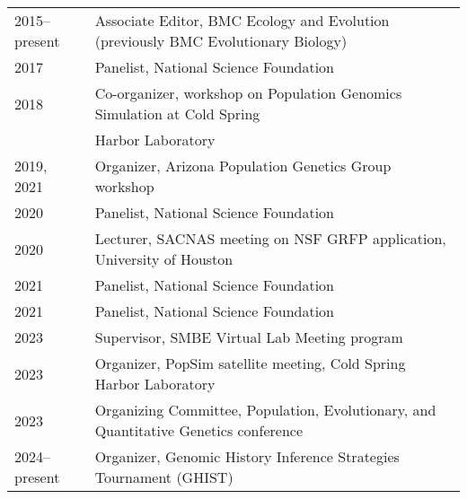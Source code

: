 \documentclass[11pt]{article}
\begin{document}
\begin{longtable}[l]{l l}
2015--present & Associate Editor, BMC Ecology and Evolution (previously BMC Evolutionary Biology)\\
2017 & Panelist, National Science Foundation\\%
2018 & Co-organizer, workshop on Population Genomics Simulation at Cold Spring\\
& Harbor Laboratory\\
2019, 2021 & Organizer, Arizona Population Genetics Group workshop\\
2020 & Panelist, National Science Foundation\\%
2020 & Lecturer, SACNAS meeting on NSF GRFP application, University of Houston\\
2021 & Panelist, National Science Foundation\\%
2021 & Panelist, National Science Foundation\\%
2023 & Supervisor, SMBE Virtual Lab Meeting program\\
2023 & Organizer, PopSim satellite meeting, Cold Spring Harbor Laboratory\\
2023 & Organizing Committee, Population, Evolutionary, and Quantitative Genetics conference\\
2024--present & Organizer, Genomic History Inference Strategies Tournament (GHIST)
\end{longtable}
\end{document}
